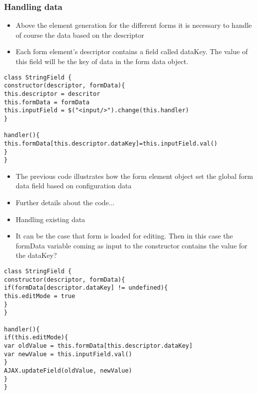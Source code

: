 \subsubsection{Handling data}

\begin{itemize}
	\item Above the element generation for the different forms it is necessary to handle of course the data based on the descriptor
	\item Each form element's descriptor contains a field called dataKey. The value of this field will be the key of data in the form data object.
\end{itemize}


\begin{lstlisting}[basicstyle=\footnotesize, frame=single, caption={Data saving}, captionpos=b]
class StringField {
constructor(descriptor, formData){
this.descriptor = descritor
this.formData = formData
this.inputField = $("<input/>").change(this.handler)
}

handler(){
this.formData[this.descriptor.dataKey]=this.inputField.val() 
}			
}
\end{lstlisting}



\begin{itemize}
	\item The previous code illustrates how the form element object set the global form data field based on configuration data
	\item Further details about the code...
\end{itemize}

\begin{itemize}
	\item Handling existing data
	\item It can be the case that form is loaded for editing. Then in this case the formData variable coming as input to the constructor contains the value for the dataKey? 
\end{itemize}

\begin{lstlisting}[basicstyle=\footnotesize, frame=single, caption={Data saving}, captionpos=b]
class StringField {
constructor(descriptor, formData){
if(formData[descriptor.dataKey] != undefined){
this.editMode = true
}
}

handler(){
if(this.editMode){
var oldValue = this.formData[this.descriptor.dataKey]
var newValue = this.inputField.val() 
}
AJAX.updateField(oldValue, newValue)
}			
}
\end{lstlisting}


